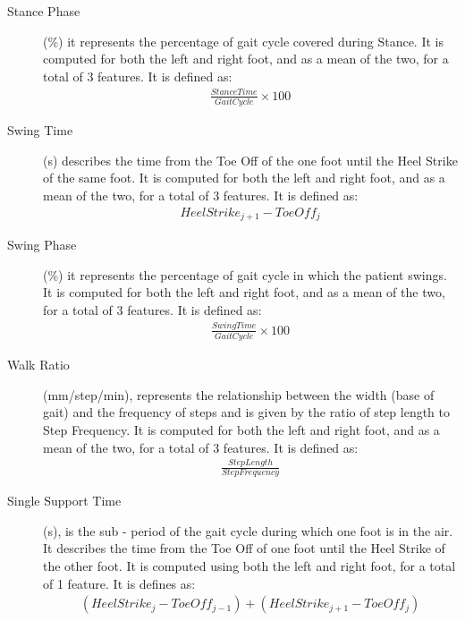 \begin{description}
\item[Stance Phase] (\%) it represents the percentage of gait cycle covered during Stance. It is computed for both the left and right foot, and as a mean of the two, for a total of 3 features. It is defined as:
\begin{equation}
\begin{aligned}
\frac{Stance Time}{Gait Cycle} \times 100
\end{aligned}
\end{equation}


\item[Swing Time] 
 (s) describes the time from the Toe Off of the one foot until the Heel Strike of the same foot. It is computed for both the left and right foot, and as a mean of the two, for a total of 3 features. It is defined as:
\begin{equation}
\begin{aligned}
Heel Strike_{j+1}-Toe Off_{j}
\end{aligned}
\end{equation}

\item[Swing Phase] (\%) it represents the percentage of gait cycle in which the patient swings. It is computed for both the left and right foot, and as a mean of the two, for a total of 3 features. It is defined as:
\begin{equation}
\begin{aligned}
\frac{Swing Time}{Gait Cycle} \times 100
\end{aligned}
\end{equation}


\item[Walk Ratio]
(mm/step/min), represents the relationship between the width (base of gait) and the frequency of steps and is given by the ratio of step length to Step Frequency. It is computed for both the left and right foot, and as a mean of the two, for a total of 3 features. It is defined as:
\begin{equation}
\begin{aligned}
\frac{Step Length}{Step Frequency}
\end{aligned}
\end{equation}


\item[Single Support Time] 
(s), is the sub - period of the gait cycle during which one foot is in the air. It describes the time from the Toe Off of one foot until the Heel Strike of the other foot. It is computed using both the left and right foot, for a total of 1 feature. It is defines as:
\begin{equation}
\begin{aligned}
(Heel Strike_j - Toe Off_{j-1}) + (Heel Strike_{j+1} - Toe Off_{j})
\end{aligned}
\end{equation}


\end{description}
